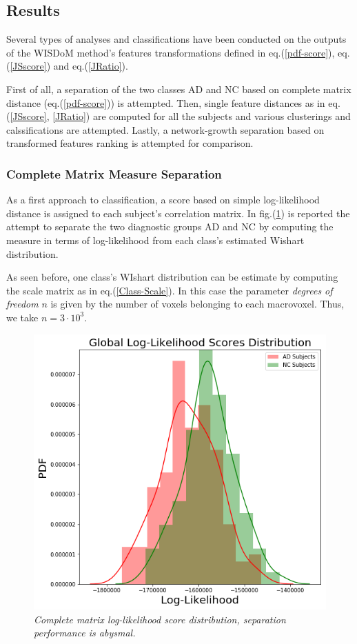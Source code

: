 \documentclass[12pt,openright,twoside,a4paper]{book}
\begin{document}
\subsection{Results}

Several types of analyses and classifications have been conducted on the outputs of the WISDoM method's  features transformations defined in eq.(\ref{pdf-score}), eq.(\ref{JSscore}) and eq.(\ref{JRatio}).

First of all, a separation of the two classes AD and NC based on complete matrix distance (eq.(\ref{pdf-score})) is attempted.
Then, single feature distances as in eq.(\ref{JSscore}, \ref{JRatio}) are computed for all the subjects and various clusterings and calssifications are attempted.
Lastly, a network-growth separation based on transformed features ranking is attempted for comparison.

\subsubsection*{Complete Matrix Measure Separation}

As a first approach to classification, a score based on simple log-likelihood distance is assigned to each subject's correlation matrix. In fig.(\ref{ADNI-global}) is reported the attempt to separate the two diagnostic groups AD and NC by computing the measure in terms of log-likelihood from each class's estimated Wishart distribution.

As seen before, one class's WIshart distribution can be estimate by computing the scale matrix as in eq.(\ref{Class-Scale}). 
In this case the parameter \textit{degrees of freedom} $n$ is given by the number of voxels belonging to each macrovoxel. Thus, we take $n=3\cdot 10^3$.

\begin{figure}[!h]
\centering
\includegraphics[scale=0.5]{ADNI-global}
\caption{\textit{Complete matrix log-likelihood score distribution, separation performance is abysmal.}}
\label{ADNI-global}
\end{figure}
\end{document}
